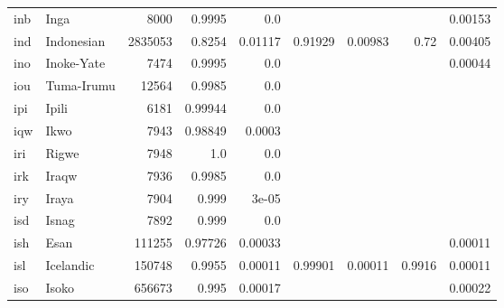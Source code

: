 \documentclass[11pt]{article}
\begin{document}
\begin{table*}[h]
{\begin{tabular}{llrrrrrrr}
inb         & Inga         & 8000         & 0.9995         & 0.0         &          &          &          & 0.00153         \\

ind         & Indonesian         & 2835053         & 0.8254         & 0.01117         & 0.91929         & 0.00983         & 0.72         & 0.00405         \\

ino         & Inoke-Yate         & 7474         & 0.9995         & 0.0         &          &          &          & 0.00044         \\

iou         & Tuma-Irumu         & 12564         & 0.9985         & 0.0         &          &          &          &          \\

ipi         & Ipili         & 6181         & 0.99944         & 0.0         &          &          &          &          \\

iqw         & Ikwo         & 7943         & 0.98849         & 0.0003         &          &          &          &          \\

iri         & Rigwe         & 7948         & 1.0         & 0.0         &          &          &          &          \\

irk         & Iraqw         & 7936         & 0.9985         & 0.0         &          &          &          &          \\

iry         & Iraya         & 7904         & 0.999         & 3e-05         &          &          &          &          \\

isd         & Isnag         & 7892         & 0.999         & 0.0         &          &          &          &          \\

ish         & Esan         & 111255         & 0.97726         & 0.00033         &          &          &          & 0.00011         \\

isl         & Icelandic         & 150748         & 0.9955         & 0.00011         & 0.99901         & 0.00011         & 0.9916         & 0.00011         \\

iso         & Isoko         & 656673         & 0.995         & 0.00017         &          &          &          & 0.00022         \\


\end{tabular}}
\end{table*}
\end{document}
